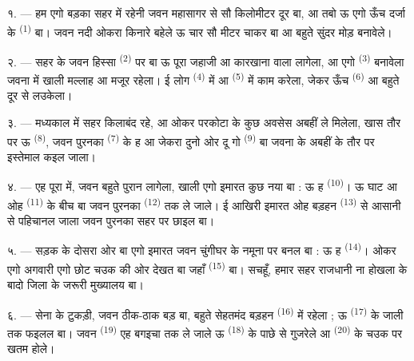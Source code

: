 \VUsaut{2.0mm}
\VUsaut{3.0mm}
\VUfilet{16mm}
\VUsaut{5.6mm}
\VUsaut{1.4mm}
\VUsaut{2.2mm}

\VUsaut{3.0mm}

१. --- हम एगो बड़का सहर में रहेनी जवन महासागर से सौ किलोमीटर दूर बा,
आ तबो ऊ एगो ऊँच दर्जा के  \textsuperscript{(1)} बा। जवन
नदी ओकरा किनारे बहेले ऊ चार सौ मीटर चाकर बा आ बहुते सुंदर मोड़ बनावेले।

२. --- सहर के जवन हिस्सा  \textsuperscript{(2)} पर बा ऊ पूरा
जहाजी आ कारखाना वाला लागेला, आ एगो  \textsuperscript{(3)}
बनावेला जवना में खाली मल्लाह आ मजूर रहेला। ई लोग 
\textsuperscript{(4)} में आ  \textsuperscript{(5)} में
काम करेला, जेकर ऊँच  \textsuperscript{(6)} आ  बहुते दूर से लउकेला।

३. --- मध्यकाल में सहर किलाबंद रहे, आ ओकर परकोटा के कुछ अवसेस अबहीं ले
मिलेला, खास तौर पर ऊ  \textsuperscript{(8)}, जवन पुरनका
 \textsuperscript{(7)} के ह आ जेकरा दुनो ओर दू गो
 \textsuperscript{(9)} बा जवना के अबहीं  के तौर पर इस्तेमाल
कइल जाला।

४. --- एह पूरा  में, जवन बहुते पुरान लागेला, खाली एगो
इमारत कुछ नया बा : ऊ ह  \textsuperscript{(10)}। ऊ घाट आ ओह
 \textsuperscript{(11)} के बीच बा जवन पुरनका  \textsuperscript{(12)} तक ले जाले। ई आखिरी इमारत ओह बड़हन
 \textsuperscript{(13)} से आसानी से पहिचानल जाला जवन पुरनका
सहर पर छाइल बा।

५. --- सड़क के दोसरा ओर  बा एगो इमारत जवन चुंगीघर के
नमूना पर बनल बा : ऊ ह  \textsuperscript{(14)}। ओकर एगो
अगवारी एगो छोट चउक की ओर देखत बा जहाँ 
\textsuperscript{(15)} बा। सचहूँ, हमार सहर राजधानी ना होखला के बादो जिला
के जरूरी मुख्यालय बा।

\VUsaut{5.0mm}
\VUsaut{3.4mm}

६. --- सेना के टुकड़ी, जवन ठीक-ठाक बड़ बा, बहुते सेहतमंद बड़हन
 \textsuperscript{(16)} में रहेला ; ऊ  \textsuperscript{(17)} के जाली तक फइलल बा। जवन 
\textsuperscript{(19)} एह बगइचा तक ले जाले ऊ 
\textsuperscript{(18)} के पाछे से गुजरेले आ 
\textsuperscript{(20)} के चउक पर खतम होले।

